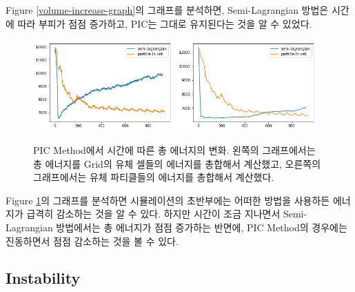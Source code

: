 \documentclass[12pt, A4]{article}
\begin{document}
Figure \ref{volume-increase-graph}의 그래프를 분석하면, Semi-Lagrangian 방법은 시간에 따라 부피가 점점 증가하고, PIC는 그대로 유지된다는 것을 알 수 있었다.

\begin{figure}[h]
  \centering
  \includegraphics[width=0.48\textwidth]{picflip-energy-graph}
  \includegraphics[width=0.48\textwidth]{picflip-particle-energy-graph}
  \caption{PIC Method에서 시간에 따른 총 에너지의 변화. 왼쪽의 그래프에서는 총 에너지를 Grid의 유체 셀들의 에너지를 총합해서 계산했고, 오른쪽의 그래프에서는 유체 파티클들의 에너지를 총합해서 계산했다.}
  \label{energy-graph}
\end{figure}

Figure \ref{energy-graph}의 그래프를 분석하면 시뮬레이션의 초반부에는 어떠한 방법을 사용하든 에너지가 급격히 감소하는 것을 알 수 있다. 하지만 시간이 조금 지나면서 Semi-Lagrangian 방법에서는 총 에너지가 점점 증가하는 반면에, PIC Method의 경우에는 진동하면서 점점 감소하는 것을 볼 수 있다.

\subsection{Instability}
\end{document}
